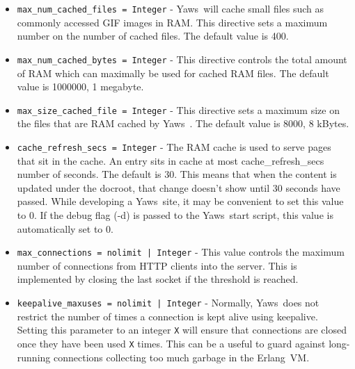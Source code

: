 \documentclass[11pt,oneside,english]{book}
\newcommand{\Erlang}            %
        {{\sc Erlang}}
\newcommand{\Yaws}            %
        {{\sc Yaws}}
\begin{document}
\begin{itemize}
\item        \verb+max_num_cached_files = Integer+ -
              \Yaws\   will  cache  small  files  such  as  commonly
              accessed  GIF images in RAM.  This directive sets a
              maximum number on the number of cached files.   The
              default value is 400.

\item        \verb+max_num_cached_bytes = Integer+ -
              This  directive  controls  the  total amount of RAM
              which can maximally be used for cached  RAM  files.
              The default value is 1000000, 1 megabyte.

\item        \verb+max_size_cached_file = Integer+ -
              This  directive  sets  a  maximum size on the files
              that are RAM cached by \Yaws\ .  The default value is
              8000, 8 kBytes.

\item        \verb+cache_refresh_secs = Integer+ -
              The  RAM  cache  is used to serve pages that sit in
              the  cache.  An  entry  sits  in  cache   at   most
              cache\_refresh\_secs  number  of seconds. The default
              is 30. This means that when the content is  updated
              under  the  docroot, that change doesn't show until
              30 seconds have passed.  While  developing  a  \Yaws\
              site,  it may be convenient to set this value to 0.
              If the debug flag (-d) is passed to the \Yaws\   start
              script, this value is automatically set to 0.

\item        \verb+max_connections = nolimit | Integer+ -
              This value controls the maximum number of connections
              from HTTP clients into the server. This is implemented
              by closing the last socket if the threshold is reached.

\item        \verb+keepalive_maxuses = nolimit | Integer+ -
              Normally, \Yaws\ does not restrict the number of times a
              connection is kept alive using keepalive. Setting this
              parameter to an integer \verb+X+ will ensure that
              connections are closed once they have been used \verb+X+
              times.  This can be a useful to guard against
              long-running connections collecting too much garbage in
              the \Erlang\ VM.


\end{itemize}
\end{document}
